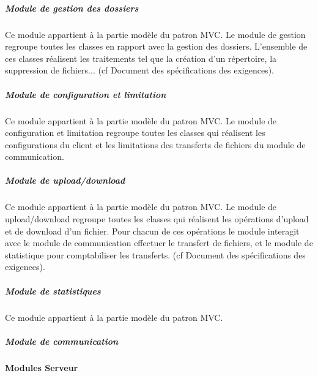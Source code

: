 \documentclass[10pt,a4paper]{report}
\begin{document}
	
				\subparagraph{Module de gestion des dossiers}
				\begin{flushleft}
				Ce module appartient à la partie modèle du patron MVC. Le module de gestion regroupe  toutes les classes en rapport avec la gestion des dossiers. L'ensemble de ces classes réalisent les traitements tel que la création d'un répertoire, la suppression de fichiers... (cf Document des spécifications des exigences).\\ 
				\end{flushleft}
	
				\subparagraph{Module de configuration et limitation}	
				\begin{flushleft}
				Ce module appartient à la partie modèle du patron MVC. Le module de configuration et limitation regroupe toutes les classes qui réalisent les configurations du client et les limitations des transferts de fichiers du module de communication.
				\end{flushleft}
	
				\subparagraph{Module de upload/download}
				\begin{flushleft}
				Ce module appartient à la partie modèle du patron MVC. Le module de upload/download regroupe toutes les classes qui réalisent les opérations d'upload et de download d'un fichier. Pour chacun de ces opérations le module interagit avec le module de communication effectuer le transfert de fichiers, et le module de statistique pour comptabiliser les transferts. (cf Document des spécifications des exigences).
				\end{flushleft}
	
				\subparagraph{Module de statistiques}
				Ce module appartient à la partie modèle du patron MVC.
	
				\subparagraph{Module de communication}


			\paragraph{Modules Serveur}
\end{document}
